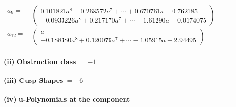 \documentclass[1p]{elsarticle_modified}
\theoremstyle{definition}
\begin{document}
\begin{tabular}{m{7pt} m{180pt} m{7pt} m{180pt} }
\flushright $a_{9}=$&$\begin{pmatrix}0.101821 a^{8}-0.268572 a^{7}+\cdots+0.670761 a-0.762185\\-0.0933226 a^{8}+0.217170 a^{7}+\cdots-1.61290 a+0.0174075\end{pmatrix}$ \\
\flushright $a_{12}=$&$\begin{pmatrix}a\\-0.188380 a^{8}+0.120076 a^{7}+\cdots-1.05915 a-2.94495\end{pmatrix}$\\&\end{tabular}
\flushleft \textbf{(ii) Obstruction class $= -1$}\\~\\
\flushleft \textbf{(iii) Cusp Shapes $= -6$}\\~\\
\newpage\renewcommand{\arraystretch}{1}
\flushleft \textbf{(iv) u-Polynomials at the component}\newline \\
\end{document}
